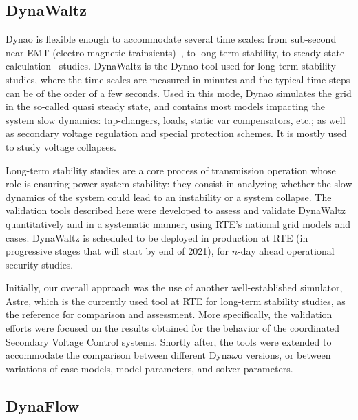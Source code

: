\documentclass[conference]{IEEEtran}
\newcommand{\Dynawo}{Dyna\textomega o\xspace} %
\begin{document}
\subsection{DynaWaltz}

\Dynawo is flexible enough to accommodate several time scales: from
sub-second near-EMT (electro-magnetic trainsients)~\cite{Masoon21}, to
long-term stability, to steady-state calculation~\cite{Cossart21}
studies. DynaWaltz is the \Dynawo tool used for long-term stability
studies, where the time scales are measured in minutes and the typical
time steps can be of the order of a few seconds. Used in this mode,
\Dynawo simulates the grid in the so-called quasi steady state, and
contains most models impacting the system slow dynamics: tap-changers,
loads, static var compensators, etc.; as well as secondary voltage
regulation and special protection schemes. It is mostly used to study
voltage collapses.

Long-term stability studies are a core process of transmission operation whose
role is ensuring power system stability: they consist in analyzing whether the
slow dynamics of the system could lead to an instability or a system
collapse. The validation tools described here were developed to assess and
validate DynaWaltz quantitatively and in a systematic manner, using RTE's
national grid models and cases. DynaWaltz is scheduled to be deployed in
production at RTE (in progressive stages that will start by end of 2021), for
$n$-day ahead operational security studies.

Initially, our overall approach was the use of another
well-established simulator, Astre, which is the currently used tool at
RTE for long-term stability studies, as the reference for comparison
and assessment. More specifically, the validation efforts were focused
on the results obtained for the behavior of the coordinated Secondary
Voltage Control systems. Shortly after, the tools were extended to
accommodate the comparison between different Dyna$\omega$o versions,
or between variations of case models, model parameters, and solver
parameters.



\subsection{DynaFlow}
\end{document}
